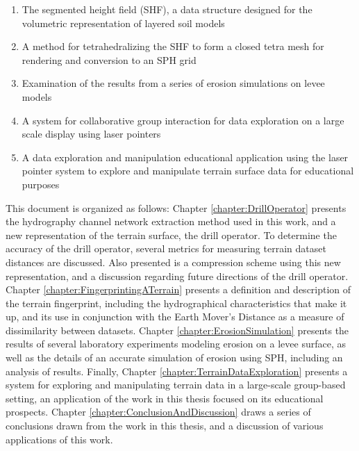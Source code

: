 \begin{enumerate}
  \item The segmented height field (SHF), a data structure designed for the volumetric representation of layered soil models
  \item A method for tetrahedralizing the SHF to form a closed tetra mesh for rendering and conversion to an SPH grid
  \item Examination of the results from a series of erosion simulations on levee models
  \item A system for collaborative group interaction for data exploration on a large scale display using laser pointers
  \item A data exploration and manipulation educational application using the laser pointer system to explore and manipulate terrain surface data for educational purposes
\end{enumerate}


This document is organized as follows: Chapter \ref{chapter:DrillOperator} presents the hydrography channel network extraction method used in this work, and a new representation of the terrain surface, the drill operator.
To determine the accuracy of the drill operator, several metrics for measuring terrain dataset distances are discussed.
Also presented is a compression scheme using this new representation, and a discussion regarding future directions of the drill operator.
Chapter \ref{chapter:FingerprintingATerrain} presents a definition and description of the terrain fingerprint, including the hydrographical characteristics that make it up, and its use in conjunction with the Earth Mover's Distance as a measure of dissimilarity between datasets.
Chapter \ref{chapter:ErosionSimulation} presents the results of several laboratory experiments modeling erosion on a levee surface, as well as the details of an accurate simulation of erosion using SPH, including an analysis of results.
Finally, Chapter \ref{chapter:TerrainDataExploration} presents a system for exploring and manipulating terrain data in a large-scale group-based setting, an application of the work in this thesis focused on its educational prospects. 
Chapter \ref{chapter:ConclusionAndDiscussion} draws a series of conclusions drawn from the work in this thesis, and a discussion of various applications of this work.


